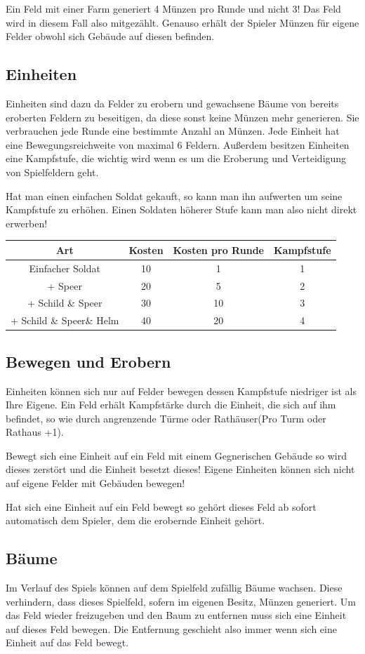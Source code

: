 \documentclass[12pt,a4paper]{article}
\begin{document}
Ein Feld mit einer Farm generiert 4 Münzen pro Runde und nicht 3! Das Feld wird in diesem Fall also mitgezählt. Genauso erhält der Spieler Münzen für eigene Felder obwohl sich Gebäude auf diesen befinden.  

\subsection{Einheiten}
Einheiten sind dazu da Felder zu erobern und gewachsene Bäume von bereits eroberten Feldern zu beseitigen, da diese sonst keine Münzen mehr generieren. Sie verbrauchen jede Runde eine bestimmte Anzahl an Münzen. Jede Einheit hat eine Bewegungsreichweite von maximal 6 Feldern. Außerdem besitzen Einheiten eine Kampfstufe, die wichtig wird wenn es um die Eroberung und Verteidigung von Spielfeldern geht.

Hat man einen einfachen Soldat gekauft, so kann man ihn aufwerten um seine Kampfstufe zu erhöhen. Einen Soldaten höherer Stufe kann man also nicht direkt erwerben! 

\begin{table}[h!]
\centering
\begin{tabular}{c|c|c|c}
\textbf{Art} & \textbf{Kosten} & \textbf{Kosten pro Runde} & \textbf{Kampfstufe} \\
\hline
Einfacher Soldat & 10 & 1 & 1 \\
\hline
+ Speer & 20 & 5 & 2 \\
\hline
+ Schild \& Speer & 30 & 10 & 3 \\
\hline
+ Schild \& Speer\& Helm & 40 & 20 & 4 \\
\end{tabular}
\end{table}
\newpage
\subsection{Bewegen und Erobern}
Einheiten können sich nur auf Felder bewegen dessen Kampfstufe niedriger ist als Ihre Eigene. 
Ein Feld erhält Kampfstärke durch die Einheit, die sich auf ihm befindet, so wie durch angrenzende Türme oder Rathäuser(Pro Turm oder Rathaus +1).

Bewegt sich eine Einheit auf ein Feld mit einem Gegnerischen Gebäude so wird dieses zerstört und die Einheit besetzt dieses! Eigene Einheiten können sich nicht auf eigene Felder mit Gebäuden bewegen!

Hat sich eine Einheit auf ein Feld bewegt so gehört dieses Feld ab sofort automatisch dem Spieler, dem die erobernde Einheit gehört.

\subsection{Bäume}
Im Verlauf des Spiels können auf dem Spielfeld zufällig Bäume wachsen. Diese verhindern, dass dieses Spielfeld, sofern im eigenen Besitz, Münzen generiert. Um das Feld wieder freizugeben und den Baum zu entfernen muss sich eine Einheit auf dieses Feld bewegen. Die Entfernung geschieht also immer wenn sich eine Einheit auf das Feld bewegt.
\end{document}
